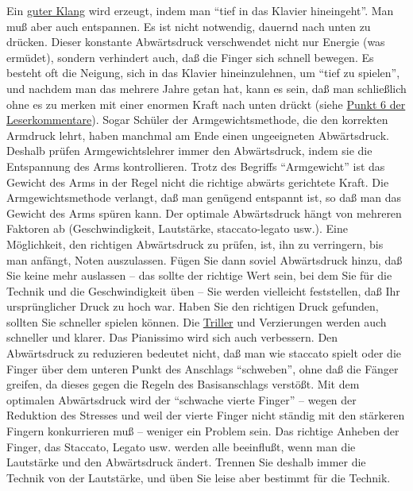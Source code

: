Ein \hyperref[c1iii1a]{guter Klang} wird erzeugt, indem man \enquote{tief in das Klavier hineingeht}.
Man muß aber auch entspannen.
Es ist nicht notwendig, dauernd nach unten zu drücken.
Dieser konstante Abwärtsdruck verschwendet nicht nur Energie (was ermüdet), sondern verhindert auch, daß die Finger sich schnell bewegen.
Es besteht oft die Neigung, sich in das Klavier hineinzulehnen, um \enquote{tief zu spielen}, und nachdem man das mehrere Jahre getan hat, kann es sein, daß man schließlich ohne es zu merken mit einer enormen Kraft nach unten drückt (siehe \hyperref[testimonials06]{Punkt 6 der Leserkommentare}).
Sogar Schüler der Armgewichtsmethode, die den korrekten Armdruck lehrt, haben manchmal am Ende einen ungeeigneten Abwärtsdruck.
Deshalb prüfen Armgewichtslehrer immer den Abwärtsdruck, indem sie die Entspannung des Arms kontrollieren.
Trotz des Begriffs \enquote{Armgewicht} ist das Gewicht des Arms in der Regel nicht die richtige abwärts gerichtete Kraft.
Die Armgewichtsmethode verlangt, daß man genügend entspannt ist, so daß man das Gewicht des Arms spüren kann.
Der optimale Abwärtsdruck hängt von mehreren Faktoren ab (Geschwindigkeit, Lautstärke, staccato-legato usw.).
Eine Möglichkeit, den richtigen Abwärtsdruck zu prüfen, ist, ihn zu verringern, bis man anfängt, Noten auszulassen.
Fügen Sie dann soviel Abwärtsdruck hinzu, daß Sie keine mehr auslassen -- das sollte der richtige Wert sein, bei dem Sie für die Technik und die Geschwindigkeit üben -- Sie werden vielleicht feststellen, daß Ihr ursprünglicher Druck zu hoch war.
Haben Sie den richtigen Druck gefunden, sollten Sie schneller spielen können.
Die \hyperref[c1iii3]{Triller} und Verzierungen werden auch schneller und klarer.
Das Pianissimo wird sich auch verbessern.
Den Abwärtsdruck zu reduzieren bedeutet nicht, daß man wie staccato spielt oder die Finger über dem unteren Punkt des Anschlags \enquote{schweben}, ohne daß die Fänger greifen, da dieses gegen die Regeln des Basisanschlags verstößt.
Mit dem optimalen Abwärtsdruck wird der \enquote{schwache vierte Finger} -- wegen der Reduktion des Stresses und weil der vierte Finger nicht ständig mit den stärkeren Fingern konkurrieren muß -- weniger ein Problem sein.
Das richtige Anheben der Finger, das Staccato, Legato usw. werden alle beeinflußt, wenn man die Lautstärke und den Abwärtsdruck ändert.
Trennen Sie deshalb immer die Technik von der Lautstärke, und üben Sie leise aber bestimmt für die Technik.

